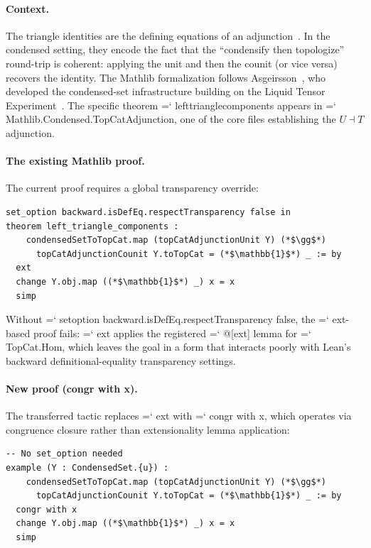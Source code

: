 \documentclass[11pt]{article}
\renewcommand{\texttt}[1]{%
  \begingroup\ttfamily\hyphenchar\font=`\-\relax
  \def\_{\textunderscore\discretionary{}{}{}}%
  #1\endgroup}
\theoremstyle{definition}
\theoremstyle{remark}
\begin{document}
\paragraph{Context.}
The triangle identities are the defining equations of an
adjunction~\cite{mac_lane_categories_1998}.  In the condensed
setting, they encode the fact that the ``condensify then
topologize'' round-trip is coherent: applying the unit and then
the counit (or vice versa) recovers the identity.  The Mathlib
formalization follows
Asgeirsson~\cite{asgeirsson_condensed_2024, asgeirsson_discrete_2024},
who developed the condensed-set infrastructure building on the
Liquid Tensor Experiment~\cite{scholze_liquid_2020, commelin_lte_2022}.
The specific theorem \texttt{left\_triangle\_components} appears in
\texttt{Mathlib.Condensed.TopCatAdjunction}, one of the core files
establishing the $U \dashv T$ adjunction.

\paragraph{The existing Mathlib proof.}
The current proof requires a global transparency override:
\begin{lstlisting}
set_option backward.isDefEq.respectTransparency false in
theorem left_triangle_components :
    condensedSetToTopCat.map (topCatAdjunctionUnit Y) (*$\gg$*)
      topCatAdjunctionCounit Y.toTopCat = (*$\mathbb{1}$*) _ := by
  ext
  change Y.obj.map ((*$\mathbb{1}$*) _) x = x
  simp
\end{lstlisting}
Without \texttt{set\_option backward.isDefEq.respectTransparency
false}, the \texttt{ext}-based proof fails: \texttt{ext} applies
the registered \texttt{@[ext]} lemma for \texttt{TopCat.Hom},
which leaves the goal in a form that interacts poorly with Lean's
backward definitional-equality transparency settings.

\paragraph{New proof (congr with x).}
The transferred tactic replaces \texttt{ext} with
\texttt{congr with x}, which operates via congruence closure
rather than extensionality lemma application:
\begin{lstlisting}
-- No set_option needed
example (Y : CondensedSet.{u}) :
    condensedSetToTopCat.map (topCatAdjunctionUnit Y) (*$\gg$*)
      topCatAdjunctionCounit Y.toTopCat = (*$\mathbb{1}$*) _ := by
  congr with x
  change Y.obj.map ((*$\mathbb{1}$*) _) x = x
  simp
\end{lstlisting}
\end{document}
